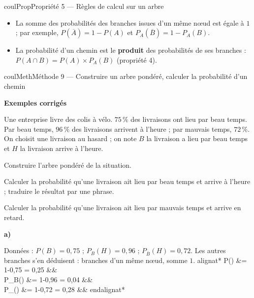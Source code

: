 \documentclass[11pt,a4paper]{article}
\makeatletter
\newlength{\retraitcalculs}
\newcounter{lycee@signet}
\newcommand{\signet}[3][]{\stepcounter{lycee@signet}%
  \edef\lycee@dest{\if\relax\detokenize{#1}\relax
    signet.\arabic{lycee@signet}\else#1\fi}%
  \hypertarget{\lycee@dest}{}\bookmark[level=#2,dest=\lycee@dest]{#3}}
\newcommand{\res}[1]{#1}
\newcounter{methode}
\newenvironment{proprietebox}[1][Propriété]%
  {\begin{boitecours}[phantom={\signet{2}{#1}}]{coulProp}{#1}}{\end{boitecours}}
\newenvironment{methodebox}[1][Méthode]{\stepcounter{methode}%
  \begin{boitecours}[phantom={\signet[methode-\arabic{methode}]{2}{#1}}]{coulMeth}{#1}}%
  {\end{boitecours}}
\newcommand{\etape}[1]{\par\smallskip\textbf{\color{coulMeth}#1}\par\nobreak\smallskip}
\newenvironment{calculs}{\setlength{\jot}{5pt}\@fleqntrue\@mathmargin\retraitcalculs
  \setlength{\abovedisplayskip}{4pt}\setlength{\belowdisplayskip}{4pt}%
  \setlength{\abovedisplayshortskip}{4pt}\setlength{\belowdisplayshortskip}{4pt}%
  \csname alignat*\endcsname{2}}%
  {\csname endalignat*\endcsname}
\newcommand{\cas}[1]{\par\smallskip\noindent\textbf{\color{coulExo}#1}\vadjust{\nobreak}}
\newenvironment{correction}{\par}{\par}
\newcommand{\etapeexemples}{\etape{Exemples corrigés}}
\makeatother
\begin{document}
\begin{proprietebox}[Propriété 5 --- Règles de calcul sur un arbre]
\begin{itemize}
  \item La somme des probabilités des branches issues d'un même nœud est égale à $1$ ;
        par exemple, $P(\overline{A})=1-P(A)$ et $P_A(\overline{B})=1-P_A(B)$.
  \item La probabilité d'un chemin est le \textbf{produit} des probabilités de ses
        branches : $P(A\cap B)=P(A)\times P_A(B)$ (propriété 4).
\end{itemize}
\end{proprietebox}

\begin{methodebox}[Méthode 9 --- Construire un arbre pondéré, calculer la probabilité d'un chemin]
\etapeexemples
Une entreprise livre des colis à vélo. $75\,\%$ des livraisons ont lieu par beau temps.
Par beau temps, $96\,\%$ des livraisons arrivent à l'heure ; par mauvais temps, $72\,\%$.
On choisit une livraison au hasard ; on note $B$ \og la livraison a lieu par beau temps\fg{} et
$H$ \og la livraison arrive à l'heure\fg{}.
\begin{questions}[label=\alph*)]
  \item Construire l'arbre pondéré de la situation.
  \item Calculer la probabilité qu'une livraison ait lieu par beau temps et arrive à
        l'heure ; traduire le résultat par une phrase.
  \item Calculer la probabilité qu'une livraison ait lieu par mauvais temps et arrive en
        retard.
\end{questions}
\begin{correction}
\cas{a)}\par\nopagebreak
\begin{minipage}[c]{0.5\linewidth}\raggedright
Données : $P(B)=0{,}75$ ; $P_B(H)=0{,}96$ ; $P_{\overline{B}}(H)=0{,}72$. Les autres
branches s'en déduisent : branches d'un même nœud, somme $1$.
\begin{calculs}
P() &= 1-0{,}75 = \res{0{,}25} &&\\
P_B() &= 1-0{,}96 = \res{0{,}04} &&\\
P_{}() &= 1-0{,}72 = \res{0{,}28} &&
\end{calculs}
\end{minipage}\hfill
\begin{minipage}[c]{0.46\linewidth}\centering
\begin{tikzpicture}

\end{tikzpicture}
\end{minipage}
\end{correction}
\end{methodebox}
\end{document}
